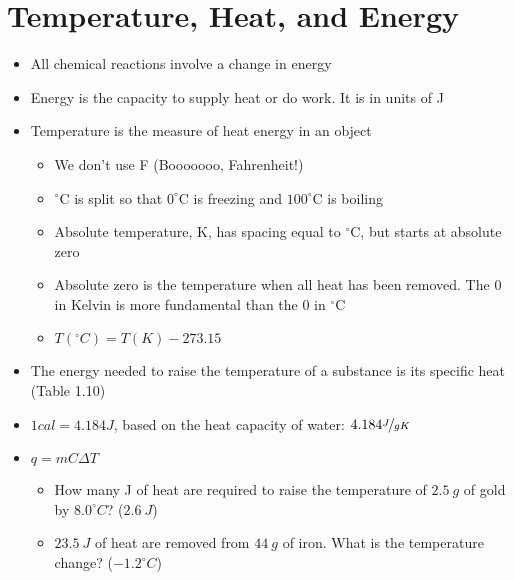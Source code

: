 \documentclass[12pt, openany, letterpaper]{memoir}
\begin{document}
\section{Temperature, Heat, and Energy}
\begin{itemize}
	\item All chemical reactions involve a change in energy
	\item Energy is the capacity to supply heat or do work. It is in units of J
	\item Temperature is the measure of heat energy in an object
	      \begin{itemize}
		      \item We don't use F (Booooooo, Fahrenheit!)
		      \item $^\circ$C is split so that $0^\circ$C is freezing and $100^\circ$C is boiling
		      \item Absolute temperature, K, has spacing equal to $^\circ$C, but starts at absolute zero
		      \item Absolute zero is the temperature when all heat has been removed. The $0$ in Kelvin is more fundamental than the $0$ in $^\circ$C
		      \item $T( ^\circ C) = T(K)-273.15$
	      \end{itemize}
	\item The energy needed to raise the temperature of a substance is its specific heat (Table 1.10)
	\item $1cal=4.184J$, based on the heat capacity of water: $4.184\nicefrac{J}{gK}$
	\item $q=mC\Delta T$
	      \begin{itemize}
		      \item How many J of heat are required to raise the temperature of $2.5~g$ of gold by $8.0^\circ C$? ($2.6~J$)
		      \item $23.5~J$ of heat are removed from $44~g$ of iron. What is the temperature change? ($-1.2^\circ C$)
	      \end{itemize}
\end{itemize}
\end{document}

